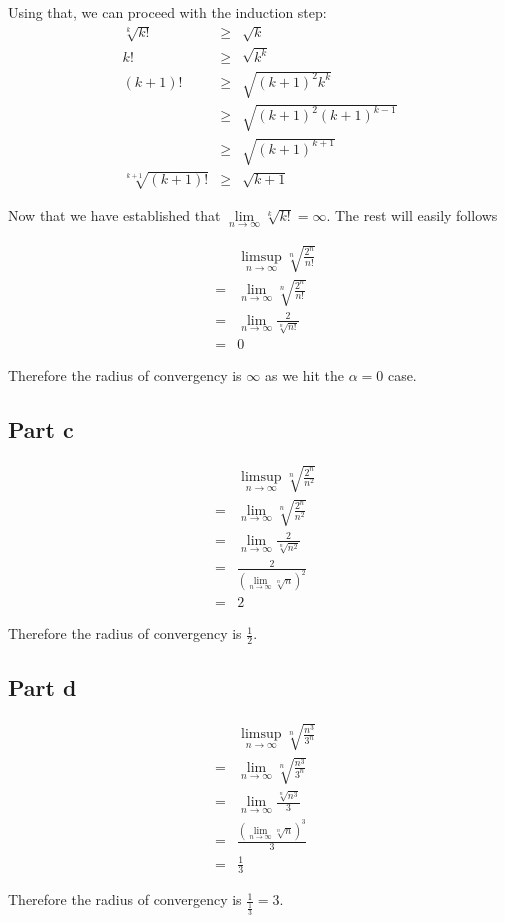 Using that, we can proceed with the induction step:
\begin{eqnarray*}
        \sqrt[k]{k!} &\ge& \sqrt{k} \\
                  k! &\ge& \sqrt{k^k} \\
              (k+1)! &\ge& \sqrt{(k+1)^2 k^k} \\
                     &\ge& \sqrt{(k+1)^2 (k+1)^{k-1}} \\
                     &\ge& \sqrt{(k+1)^{k+1}} \\
  \sqrt[k+1]{(k+1)!} &\ge& \sqrt{k+1}
\end{eqnarray*}

Now that we have established that $ \lim\limits_{n \to \infty} \sqrt[k]{k!} = \infty $. The rest will easily follows

\begin{eqnarray*}
  & & \limsup\limits_{n \to \infty} \sqrt[n]{\frac{2^n}{n!}} \\
  &=& \lim\limits_{n \to \infty} \sqrt[n]{\frac{2^n}{n!}} \\
  &=& \lim\limits_{n \to \infty} \frac{2}{\sqrt[n]{n!}} \\
  &=& 0
\end{eqnarray*}

Therefore the radius of convergency is $ \infty $ as we hit the $ \alpha = 0 $ case.

\subsection*{Part c}

\begin{eqnarray*}
  & & \limsup\limits_{n \to \infty} \sqrt[n]{\frac{2^n}{n^2}} \\
  &=& \lim\limits_{n \to \infty} \sqrt[n]{\frac{2^n}{n^2}} \\
  &=& \lim\limits_{n \to \infty} \frac{2}{\sqrt[n]{n^2}} \\
  &=& \frac{2}{(\lim\limits_{n \to \infty} \sqrt[n]{n})^2} \\
  &=& 2
\end{eqnarray*}

Therefore the radius of convergency is $ \frac{1}{2} $.

\subsection*{Part d}

\begin{eqnarray*}
  & & \limsup\limits_{n \to \infty} \sqrt[n]{\frac{n^3}{3^n}} \\
  &=& \lim\limits_{n \to \infty} \sqrt[n]{\frac{n^3}{3^n}} \\
  &=& \lim\limits_{n \to \infty} \frac{\sqrt[n]{n^3}}{3} \\
  &=& \frac{(\lim\limits_{n \to \infty} \sqrt[n]{n})^3}{3} \\
  &=& \frac{1}{3}
\end{eqnarray*}

Therefore the radius of convergency is $ \frac{1}{\frac{1}{3}} = 3 $.